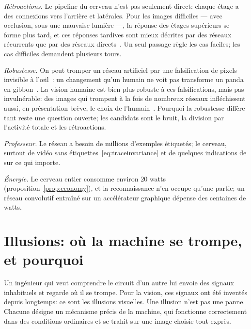 \emph{Rétroactions.} Le pipeline du cerveau n'est pas seulement direct: chaque étage a des connexions vers l'arrière et latérales. Pour les images difficiles --- avec occlusion, sous une mauvaise lumière ---, la réponse des étages supérieurs se forme plus tard, et ces réponses tardives sont mieux décrites par des réseaux récurrents que par des réseaux directs~\cite{Kar2019}. Un seul passage règle les cas faciles; les cas difficiles demandent plusieurs tours.

\emph{Robustesse.} On peut tromper un réseau artificiel par une falsification de pixels invisible à l'œil~\cite{Szegedy2014}: un changement qu'un humain ne voit pas transforme un \og panda\fg{} en \og gibbon\fg{}~\cite{Goodfellow2015}. La vision humaine est bien plus robuste à ces falsifications, mais pas invulnérable: des images qui trompent à la fois de nombreux réseaux infléchissent aussi, en présentation brève, le choix de l'humain~\cite{Elsayed2018}. Pourquoi la robustesse diffère tant reste une question ouverte; les candidats sont le bruit, la division par l'activité totale et les rétroactions.

\emph{Professeur.} Le réseau a besoin de millions d'exemples étiquetés; le cerveau, surtout de vidéo sans étiquettes~\eqref{eq:traceinvariance} et de quelques indications de  sur ce qui importe.

\emph{Énergie.} Le cerveau entier consomme environ $20$ watts (proposition~\ref{prop:economy}), et la reconnaissance n'en occupe qu'une partie; un réseau convolutif entraîné sur un accélérateur graphique dépense des centaines de watts.

\section{Illusions: où la machine se trompe, et pourquoi}
\label{sec:illusions}

Un ingénieur qui veut comprendre le circuit d'un autre lui envoie des signaux inhabituels et regarde où il se trompe. Pour la vision, ces signaux ont été inventés depuis longtemps: ce sont les illusions visuelles. Une illusion n'est pas une panne. Chacune désigne un mécanisme précis de la machine, qui fonctionne correctement dans des conditions ordinaires et se trahit sur une image choisie tout exprès.

